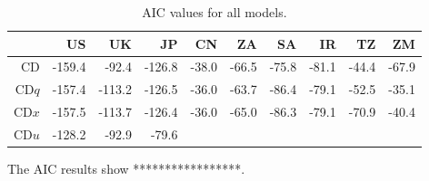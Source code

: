 \documentclass[preprint,authoryear,12pt]{elsarticle}\usepackage{graphicx, color}
\begin{document}
\begin{table}[ht]
\begin{center}
\caption{AIC values for all models.}
\label{tab:AICTable}
\begin{tabular}{rrrrrrrrrr}
  \hline
 & US & UK & JP & CN & ZA & SA & IR & TZ & ZM \\ 
  \hline
CD & -159.4 & -92.4 & -126.8 & -38.0 & -66.5 & -75.8 & -81.1 & -44.4 & -67.9 \\ 
  CD$q$ & -157.4 & -113.2 & -126.5 & -36.0 & -63.7 & -86.4 & -79.1 & -52.5 & -35.1 \\ 
  CD$x$ & -157.5 & -113.7 & -126.4 & -36.0 & -65.0 & -86.3 & -79.1 & -70.9 & -40.4 \\ 
  CD$u$ & -128.2 & -92.9 & -79.6 &  &  &  &  &  &  \\ 
   \hline
\end{tabular}
\end{center}
\end{table}



The AIC results show *****************.


\end{document}

